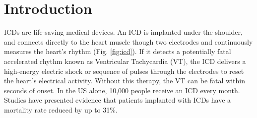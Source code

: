 \section{Introduction}
\label{sec:intro}
\acp{ICD} are life-saving medical devices.
An \ac{ICD} is implanted under the shoulder, and connects directly to the heart muscle though two electrodes and continuously measures the heart's rhythm (Fig. \ref{fig:icd}).
If it detects a potentially fatal accelerated rhythm known as Ventricular Tachycardia (VT), the \ac{ICD} delivers a high-energy electric shock or sequence of pulses through the electrodes to reset the heart's electrical activity.
Without this therapy, the VT can be fatal within seconds of onset.
In the US alone, 10,000 people receive an \ac{ICD} every month.
Studies have presented evidence that patients implanted with \acp{ICD} have a mortality rate reduced by up to 31\%.

